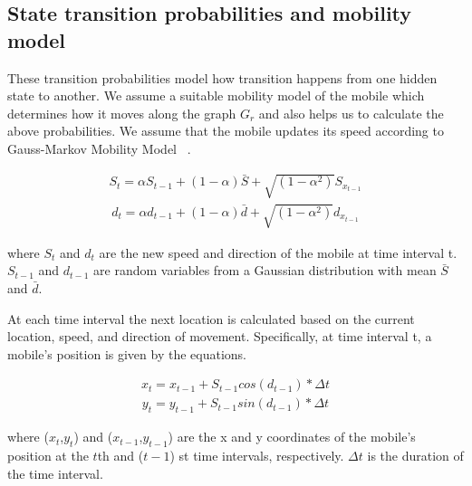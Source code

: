 \documentclass[conference, 10pt]{IEEEtran}
\begin{document}
\subsection{State transition probabilities and mobility model} 
\label{sec:statemodel}
These transition
probabilities model how transition happens from one hidden state
to another. 
We assume a suitable mobility model of the mobile which determines how it moves
along the graph $G_r$ and also helps us to calculate the above probabilities. We
assume that the mobile updates its speed according to Gauss-Markov Mobility Model ~\cite{Camp2002}.

\begin{align}
S_t = \alpha S_{t-1}+(1-\alpha)\bar{S}+\sqrt{(1-\alpha^2)}S_{x_{t-1}}
\label{eqn:speed}
\end{align}
\begin{align}
d_t = \alpha d_{t-1}+(1-\alpha)\bar{d}+\sqrt{(1-\alpha^2)}d_{x_{t-1}}
\label{eqn:speed}
\end{align}

 where $S_t$ and $d_t$ are the new speed and direction of the mobile at time interval t. $S_{t-1}$ and $d_{t-1}$
 are random variables from a Gaussian distribution with mean $\bar{S}$ and $\bar{d}$.
 
 At each time interval the next location is calculated based on the current location, speed, and direction of movement.
Specifically, at time interval t, a mobile's position is given by the equations.

\begin{align}
	x_t = x_{t-1} +S_{t-1}cos(d_{t-1})*\Delta t
\label{eqn:mobilitymodelx}
\end{align}
\begin{align}
y_t = y_{t-1} +S_{t-1}sin(d_{t-1})*\Delta t
\label{eqn:mobilitymodely}
\end{align}

where ($x_t$,$y_t$) and ($x_{t-1}$,$y_{t-1}$) are the x and y coordinates of the mobile’s position 
at the $t$th and ($t-1$) st time intervals, respectively. $\Delta t$ is the duration of the time interval.
\end{document}
